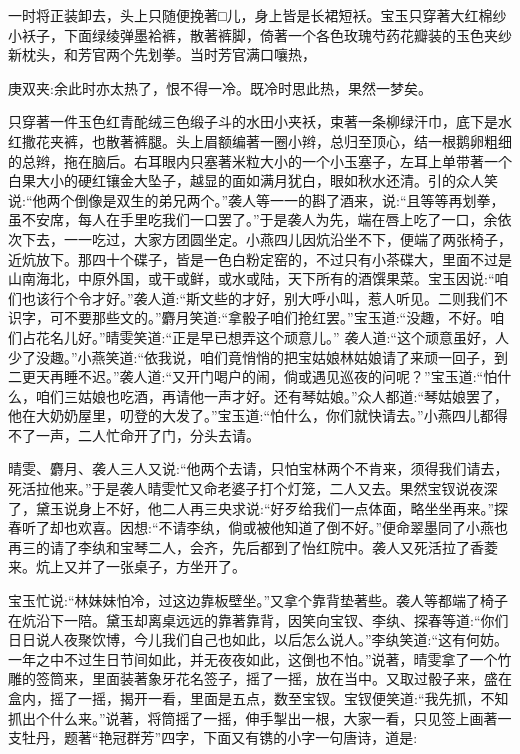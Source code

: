 \begin{parag}
    一时将正装卸去，头上只随便挽著□儿，身上皆是长裙短袄。宝玉只穿著大红棉纱小袄子，下面绿绫弹墨袷裤，散著裤脚，倚著一个各色玫瑰芍药花瓣装的玉色夹纱新枕头，和芳官两个先划拳。当时芳官满口嚷热，\begin{note}庚双夹:余此时亦太热了，恨不得一冷。既冷时思此热，果然一梦矣。\end{note}只穿著一件玉色红青酡绒三色缎子斗的水田小夹袄，束著一条柳绿汗巾，底下是水红撒花夹裤，也散著裤腿。头上眉额编著一圈小辫，总归至顶心，结一根鹅卵粗细的总辫，拖在脑后。右耳眼内只塞著米粒大小的一个小玉塞子，左耳上单带著一个白果大小的硬红镶金大坠子，越显的面如满月犹白，眼如秋水还清。引的众人笑说:“他两个倒像是双生的弟兄两个。”袭人等一一的斟了酒来，说:“且等等再划拳，虽不安席，每人在手里吃我们一口罢了。”于是袭人为先，端在唇上吃了一口，余依次下去，一一吃过，大家方团圆坐定。小燕四儿因炕沿坐不下，便端了两张椅子，近炕放下。那四十个碟子，皆是一色白粉定窑的，不过只有小茶碟大，里面不过是山南海北，中原外国，或干或鲜，或水或陆，天下所有的酒馔果菜。宝玉因说:“咱们也该行个令才好。”袭人道:“斯文些的才好，别大呼小叫，惹人听见。二则我们不识字，可不要那些文的。”麝月笑道:“拿骰子咱们抢红罢。”宝玉道:“没趣，不好。咱们占花名儿好。”晴雯笑道:“正是早已想弄这个顽意儿。” 袭人道:“这个顽意虽好，人少了没趣。”小燕笑道:“依我说，咱们竟悄悄的把宝姑娘林姑娘请了来顽一回子，到二更天再睡不迟。”袭人道:“又开门喝户的闹，倘或遇见巡夜的问呢？”宝玉道:“怕什么，咱们三姑娘也吃酒，再请他一声才好。还有琴姑娘。”众人都道:“琴姑娘罢了，他在大奶奶屋里，叨登的大发了。”宝玉道:“怕什么，你们就快请去。”小燕四儿都得不了一声，二人忙命开了门，分头去请。
\end{parag}


\begin{parag}
    晴雯、麝月、袭人三人又说:“他两个去请，只怕宝林两个不肯来，须得我们请去，死活拉他来。”于是袭人晴雯忙又命老婆子打个灯笼，二人又去。果然宝钗说夜深了，黛玉说身上不好，他二人再三央求说:“好歹给我们一点体面，略坐坐再来。”探春听了却也欢喜。因想:“不请李纨，倘或被他知道了倒不好。”便命翠墨同了小燕也再三的请了李纨和宝琴二人，会齐，先后都到了怡红院中。袭人又死活拉了香菱来。炕上又并了一张桌子，方坐开了。
\end{parag}


\begin{parag}
    宝玉忙说:“林妹妹怕冷，过这边靠板壁坐。”又拿个靠背垫著些。袭人等都端了椅子在炕沿下一陪。黛玉却离桌远远的靠著靠背，因笑向宝钗、李纨、探春等道:“你们日日说人夜聚饮博，今儿我们自己也如此，以后怎么说人。”李纨笑道:“这有何妨。一年之中不过生日节间如此，并无夜夜如此，这倒也不怕。”说著，晴雯拿了一个竹雕的签筒来，里面装著象牙花名签子，摇了一摇，放在当中。又取过骰子来，盛在盒内，摇了一摇，揭开一看，里面是五点，数至宝钗。宝钗便笑道:“我先抓，不知抓出个什么来。”说著，将筒摇了一摇，伸手掣出一根，大家一看，只见签上画著一支牡丹，题著“艳冠群芳”四字，下面又有镌的小字一句唐诗，道是:
\end{parag}


